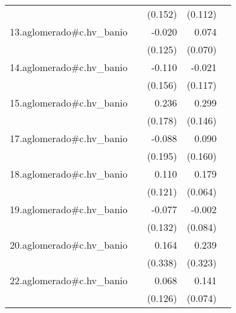 {\begin{longtable}{l*{4}{D{.}{.}{-1}}}
            &                     &     (0.152)         &     (0.112)         &                     \\
\addlinespace
13.aglomerado#c.hv\_banio&                     &      -0.020         &       0.074         &                     \\
            &                     &     (0.125)         &     (0.070)         &                     \\
\addlinespace
14.aglomerado#c.hv\_banio&                     &      -0.110         &      -0.021         &                     \\
            &                     &     (0.156)         &     (0.117)         &                     \\
\addlinespace
15.aglomerado#c.hv\_banio&                     &       0.236         &       0.299\sym{*}  &                     \\
            &                     &     (0.178)         &     (0.146)         &                     \\
\addlinespace
17.aglomerado#c.hv\_banio&                     &      -0.088         &       0.090         &                     \\
            &                     &     (0.195)         &     (0.160)         &                     \\
\addlinespace
18.aglomerado#c.hv\_banio&                     &       0.110         &       0.179\sym{**} &                     \\
            &                     &     (0.121)         &     (0.064)         &                     \\
\addlinespace
19.aglomerado#c.hv\_banio&                     &      -0.077         &      -0.002         &                     \\
            &                     &     (0.132)         &     (0.084)         &                     \\
\addlinespace
20.aglomerado#c.hv\_banio&                     &       0.164         &       0.239         &                     \\
            &                     &     (0.338)         &     (0.323)         &                     \\
\addlinespace
22.aglomerado#c.hv\_banio&                     &       0.068         &       0.141         &                     \\
            &                     &     (0.126)         &     (0.074)         &                     \\

\end{longtable}}
